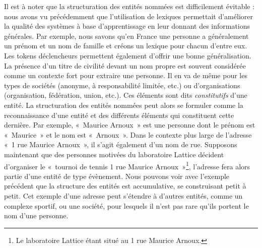 \documentclass[12pt,a4paper,times,twoside,openright]{report}
\begin{document}
Il est à noter que la structuration des entités nommées est difficilement évitable : nous avons vu précédemment que l'utilisation de lexiques permettait d'améliorer la qualité des systèmes à base d'apprentissage en leur donnant des informations générales. Par exemple, nous savons qu'en France une personne a généralement un prénom et un nom de famille et créons un lexique pour chacun d'entre eux. Les tokens déclencheurs permettent également d'offrir une bonne généralisation. La présence d'un titre de civilité devant un nom propre est souvent considérée comme un contexte fort pour extraire une personne. Il en va de même pour les types de sociétés (anonyme, à responsabilité limitée, etc.) ou d'organisations (organisation, fédération, union, etc.). Ces éléments sont dits \emph{constitutifs} d'une entité. La structuration des entités nommées peut alors se formuler comme la reconnaissance d'une entité et des différents éléments qui constituent cette dernière. Par exemple, «\ Maurice Arnoux\ » est une personne dont le prénom est «\ Maurice\ » et le nom est «\ Arnoux\ ». Dans le contexte plus large de l'adresse «\ 1 rue Maurice Arnoux\ », il s'agit également d'un nom de rue. Supposons maintenant que des personnes motivées du laboratoire Lattice décident d'organiser le «\ tournoi de tennis 1 rue Maurice Arnoux\ »\footnote{Le laboratoire Lattice étant situé au 1 rue Maurice Arnoux.}, l'adresse fera alors partie d'une entité de type évènement. Nous pouvons voir avec l'exemple précédent que la structure des entités est accumulative, se construisant petit à petit. Cet exemple d'une adresse peut s'étendre à d'autres entités, comme un complexe sportif, ou une société, pour lesquels il n'est pas rare qu'ils portent le nom d'une personne.
\end{document}
